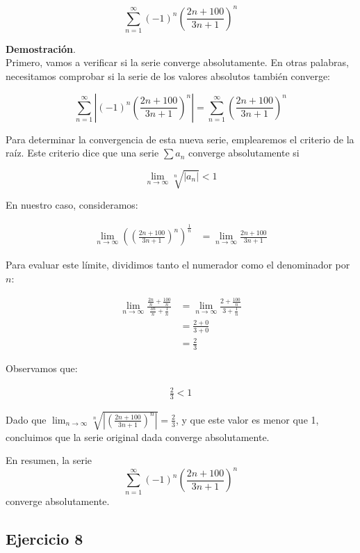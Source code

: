 \documentclass{article}
\begin{document}
    $$
    \sum_{n=1}^{\infty}(-1)^{n}\left(\frac{2 n+100}{3 n+1}\right)^{n}
    $$

    \textbf{Demostración}.\\

    Primero, vamos a verificar si la serie converge absolutamente. En otras palabras, necesitamos comprobar si la serie de los valores absolutos también converge:

    $$
    \sum_{n=1}^{\infty}\left|(-1)^{n}\left(\frac{2 n+100}{3 n+1}\right)^{n}\right|=\sum_{n=1}^{\infty}\left(\frac{2 n+100}{3 n+1}\right)^{n}
    $$

    Para determinar la convergencia de esta nueva serie, emplearemos el criterio de la raíz. Este criterio dice que una serie \(\sum a_n\) converge absolutamente si

    \[
    \lim_{n \to \infty} \sqrt[n]{|a_n|} < 1
    \]

    En nuestro caso, consideramos:

    \begin{align*}
    \lim_{n \rightarrow \infty}\left(\left(\frac{2 n+100}{3 n+1}\right)^{n}\right)^{\frac{1}{n}} &= \lim_{n \rightarrow \infty} \frac{2 n+100}{3 n+1}
    \end{align*}

    Para evaluar este límite, dividimos tanto el numerador como el denominador por \(n\):

    \begin{align*}
    \lim_{n \rightarrow \infty} \frac{\frac{2 n}{n}+\frac{100}{n}}{\frac{3 n}{n}+\frac{1}{n}} &= \lim_{n \rightarrow \infty} \frac{2+\frac{100}{n}}{3+\frac{1}{n}} \\
    &= \frac{2+0}{3+0} \\
    &= \frac{2}{3}
    \end{align*}

    Observamos que:

    \begin{align*}
    \frac{2}{3} < 1
    \end{align*}

    Dado que \(\lim_{n \to \infty} \sqrt[n]{\left|\left(\frac{2 n + 100}{3 n + 1}\right)^n\right|} = \frac{2}{3}\), y que este valor es menor que 1, concluimos que la serie original dada converge absolutamente.

    En resumen, la serie
    $$
    \sum_{n=1}^{\infty}(-1)^{n}\left(\frac{2 n+100}{3 n+1}\right)^{n}
    $$
    converge absolutamente.

    \subsection*{Ejercicio 8}
\end{document}
